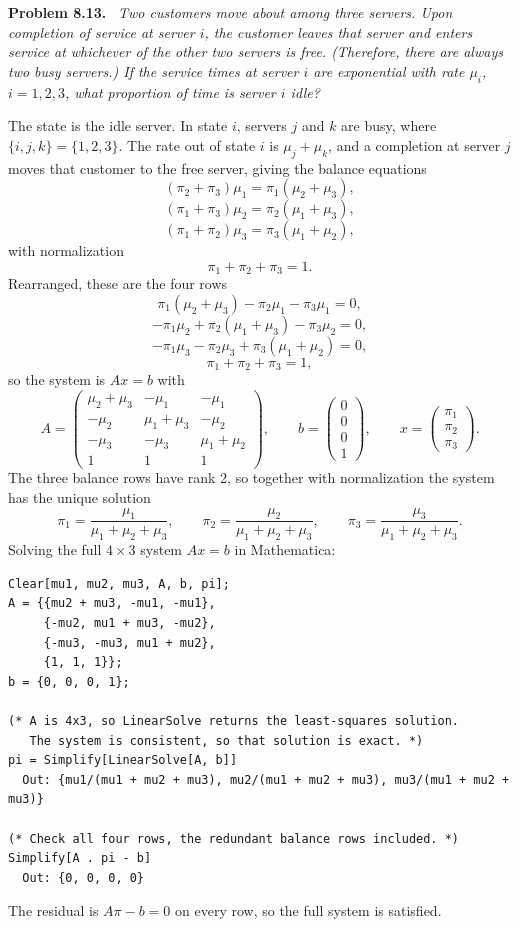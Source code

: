\documentclass[11pt]{article}
\newenvironment{problem}[1]
  {\par\medskip\noindent\textbf{Problem #1.}\ \itshape}
  {\par\medskip}
\begin{document}
\begin{problem}{8.13}
Two customers move about among three servers. Upon completion of service at server $i$, the customer leaves that server and enters service at whichever of the other two servers is free. (Therefore, there are always two busy servers.) If the service times at server $i$ are exponential with rate $\mu_i$, $i=1,2,3$, what proportion of time is server $i$ idle?
\end{problem}
The state is the idle server. In state $i$, servers $j$ and $k$ are busy, where $\{i,j,k\}=\{1,2,3\}$. The rate out of state $i$ is $\mu_j+\mu_k$, and a completion at server $j$ moves that customer to the free server, giving the balance equations
$$(\pi_2+\pi_3)\mu_1=\pi_1(\mu_2+\mu_3),$$
$$(\pi_1+\pi_3)\mu_2=\pi_2(\mu_1+\mu_3),$$
$$(\pi_1+\pi_2)\mu_3=\pi_3(\mu_1+\mu_2),$$
with normalization
$$\pi_1+\pi_2+\pi_3=1.$$
Rearranged, these are the four rows
$$\pi_1(\mu_2+\mu_3)-\pi_2\mu_1-\pi_3\mu_1=0,$$
$$-\pi_1\mu_2+\pi_2(\mu_1+\mu_3)-\pi_3\mu_2=0,$$
$$-\pi_1\mu_3-\pi_2\mu_3+\pi_3(\mu_1+\mu_2)=0,$$
$$\pi_1+\pi_2+\pi_3=1,$$
so the system is $A x=b$ with
$$A=\begin{pmatrix}\mu_2+\mu_3 & -\mu_1 & -\mu_1\\ -\mu_2 & \mu_1+\mu_3 & -\mu_2\\ -\mu_3 & -\mu_3 & \mu_1+\mu_2\\ 1 & 1 & 1\end{pmatrix},\qquad b=\begin{pmatrix}0\\0\\0\\1\end{pmatrix},\qquad x=\begin{pmatrix}\pi_1\\\pi_2\\\pi_3\end{pmatrix}.$$
The three balance rows have rank 2, so together with normalization the system has the unique solution
$$\pi_1=\frac{\mu_1}{\mu_1+\mu_2+\mu_3},\qquad \pi_2=\frac{\mu_2}{\mu_1+\mu_2+\mu_3},\qquad \pi_3=\frac{\mu_3}{\mu_1+\mu_2+\mu_3}.$$
Solving the full $4\times 3$ system $Ax=b$ in Mathematica:

\begin{verbatim}
Clear[mu1, mu2, mu3, A, b, pi];
A = {{mu2 + mu3, -mu1, -mu1},
     {-mu2, mu1 + mu3, -mu2},
     {-mu3, -mu3, mu1 + mu2},
     {1, 1, 1}};
b = {0, 0, 0, 1};

(* A is 4x3, so LinearSolve returns the least-squares solution.
   The system is consistent, so that solution is exact. *)
pi = Simplify[LinearSolve[A, b]]
  Out: {mu1/(mu1 + mu2 + mu3), mu2/(mu1 + mu2 + mu3), mu3/(mu1 + mu2 + mu3)}

(* Check all four rows, the redundant balance rows included. *)
Simplify[A . pi - b]
  Out: {0, 0, 0, 0}
\end{verbatim}

The residual is $A\pi-b=0$ on every row, so the full system is satisfied.
\end{document}
